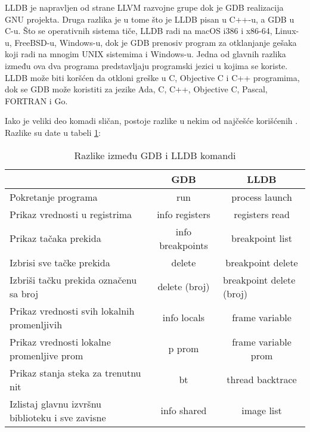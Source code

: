 \documentclass[a4paper]{article}
\begin{document}
LLDB je napravljen od strane LLVM razvojne grupe dok je GDB 
realizacija GNU projekta. Druga razlika je u tome što je LLDB 
pisan u C++-u, a GDB u C-u. Što se operativnih sistema tiče, LLDB 
radi na macOS i386 i x86-64, Linux-u,  FreeBSD-u, Windows-u, 
dok je GDB prenosiv program za otklanjanje gešaka koji radi na 
mnogim UNIX sistemima i Windows-u. Jedna od glavnih razlika 
između ova dva programa predstavljaju programski jezici u kojima 
se koriste. LLDB može biti koršćen da otkloni greške u C, Objective 
C i C++ programima, dok se GDB može koristiti za jezike  Ada, C, 
C++, Objective C, Pascal, FORTRAN i Go.

Iako je veliki deo komadi sličan, postoje razlike u nekim od 
najčešće korišćenih \cite{lldb}. Razlike su date u tabeli \ref{tab:tabela1}:


\begin{table}[h!]
\begin{center}
\caption{Razlike između GDB i LLDB komandi}
\begin{tabular}{|l|c|c|} \hline
                                                 & GDB            & LLDB                                                                  \\ \hline
\rowcolor[HTML]{C0C0C0} 
Pokretanje programa                              & run            & process launch                                                        \\
Prikaz vrednosti u registrima                    & info registers & registers read                                                        \\
\rowcolor[HTML]{C0C0C0} 
Prikaz tačaka prekida                            & info breakpoints     & breakpoint list                                                       \\
Izbrisi sve tačke prekida                        & delete         & breakpoint delete                                                     \\
\rowcolor[HTML]{C0C0C0} 
Izbriši tačku prekida označenu sa broj           & delete (broj)  & \multicolumn{1}{l|}{\cellcolor[HTML]{C0C0C0}breakpoint delete (broj)} \\
Prikaz vrednosti svih lokalnih promenljivih      & info locals    & frame variable                                                        \\
\rowcolor[HTML]{C0C0C0} 
Prikaz vrednosti lokalne promenljive prom        & p prom         & frame variable prom                                                   \\
Prikaz stanja steka za trenutnu nit              & bt             & thread backtrace                                                      \\
\rowcolor[HTML]{C0C0C0} 
Izlistaj glavnu izvršnu biblioteku i sve zavisne & info shared    & image list                                                            \\ \hline
\end{tabular}
\label{tab:tabela1}
\end{center}
\end{table}
\end{document}
